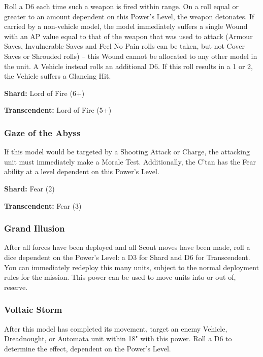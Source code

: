 Roll a D6 each time such a weapon is fired within range. On a roll equal or greater to an amount dependent on this Power's Level, the weapon detonates. If carried by a non-vehicle model, the model immediately suffers a single Wound with an AP value equal to that of the weapon that was used to attack (Armour Saves, Invulnerable Saves and Feel No Pain rolls can be taken, but not Cover Saves or Shrouded rolls) – this Wound cannot be allocated to any other model in the unit. A Vehicle instead rolls an additional D6. If this roll results in a 1 or 2, the Vehicle suffers a Glancing Hit.

\textbf{Shard:} Lord of Fire (6+)

\textbf{Transcendent:} Lord of Fire (5+)


\subsubsection{Gaze of the Abyss} \label{Gaze of the Abyss}

If this model would be targeted by a Shooting Attack or Charge, the attacking unit must immediately make a Morale Test. Additionally, the C'tan has the Fear ability at a level dependent on this Power's Level.

\textbf{Shard:} Fear (2)

\textbf{Transcendent:} Fear (3)


\subsubsection{Grand Illusion} \label{Grand Illusion}

After all forces have been deployed and all Scout moves have been made, roll a dice dependent on the Power's Level: a D3 for Shard and D6 for Transcendent. You can immediately redeploy this many units, subject to the normal deployment rules for the mission. This power can be used to move units into or out of, reserve.


\subsubsection{Voltaic Storm} \label{Voltaic Storm}

After this model has completed its movement, target an enemy Vehicle, Dreadnought, or Automata unit within 18" with this power. Roll a D6 to determine the effect, dependent on the Power's Level.


